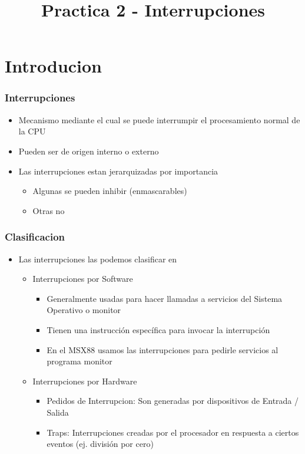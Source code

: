 \documentclass{beamer}
\title{Practica 2 - Interrupciones}
\begin{document}
\begin{frame}
\titlepage
\end{frame}

\section{Introducion}

\begin{frame}
\frametitle{Interrupciones}
\begin{itemize}
 \item Mecanismo mediante el cual se puede interrumpir el procesamiento normal de la CPU
 \item Pueden ser de origen interno o externo
 \item Las interrupciones estan jerarquizadas por importancia
 \begin{itemize}
   \item Algunas se pueden inhibir (enmascarables)
   \item Otras no
 \end{itemize}
 \end{itemize}
\end{frame}

\begin{frame}
\frametitle{Clasificacion}
\begin{itemize}
 \item Las interrupciones las podemos clasificar en
 \begin{itemize}

 \item Interrupciones por Software
 \begin{itemize}
   \item Generalmente usadas para hacer llamadas a servicios del Sistema Operativo o monitor
   \item Tienen una instrucción específica para invocar la interrupción
   \item En el MSX88 usamos las interrupciones para pedirle servicios al programa monitor
 \end{itemize}

 \item Interrupciones por Hardware
 \begin{itemize}
   \item Pedidos de Interrupcion: Son generadas por dispositivos de Entrada / Salida
   \item Traps: Interrupciones creadas por el procesador en respuesta a ciertos eventos (ej. división por cero)
 \end{itemize}
 \end{itemize}
 \end{itemize}

\end{frame}
\end{document}
